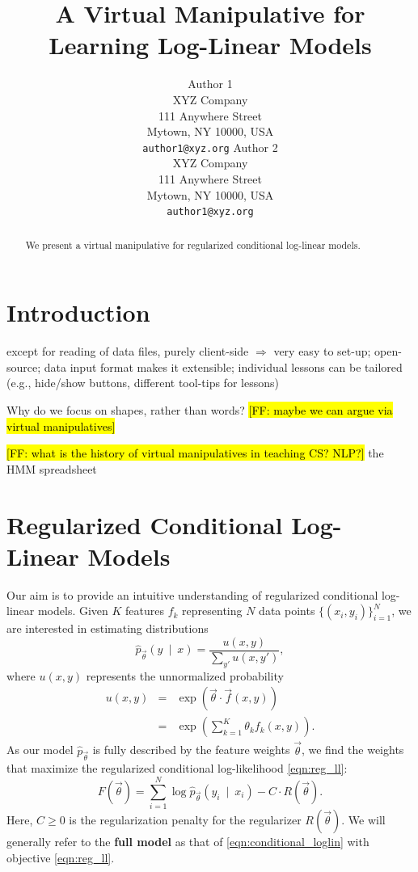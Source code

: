 \documentclass[11pt,letterpaper]{article}
\title{A Virtual Manipulative for Learning Log-Linear Models}
\author{
	 Author 1\\
	    XYZ Company\\
	    111 Anywhere Street\\
	    Mytown, NY 10000, USA\\
	    {\tt author1@xyz.org}
	  \And
	  Author 2\\
	    XYZ Company\\
	    111 Anywhere Street\\
	    Mytown, NY 10000, USA\\
	    {\tt author1@xyz.org}
 }
\date{}
\newcommand{\Note}[1]{}
\renewcommand{\Note}[1]{\hl{[#1]}}
\newcommand{\NoteSigned}[3]{{\sethlcolor{#2}\Note{#1: #3}}}
\newcommand{\NoteFF}[1]{\NoteSigned{FF}{LightBlue}{#1}}
\begin{document}
\maketitle

\begin{abstract}
We present a virtual manipulative for regularized conditional log-linear models. 
\end{abstract}

\section{Introduction}\label{sec:intro}
except for reading of data files, purely client-side $\Rightarrow$ very easy to set-up;
open-source;
data input format makes it extensible;
individual lessons can be tailored (e.g., hide/show buttons, different tool-tips for lessons)

Why do we focus on shapes, rather than words? \NoteFF{maybe we can argue via virtual manipulatives}

\NoteFF{what is the history of virtual manipulatives in teaching CS? NLP?} the HMM spreadsheet \cite{eisner-2002-tnlp}

\section{Regularized Conditional Log-Linear Models}
Our aim is to provide an intuitive understanding of regularized conditional log-linear models. Given $K$ features $f_k$ representing $N$ data points $\{( x_i, y_i)\}_{i=1}^N$, we are interested in estimating distributions 
\begin{equation}
\hat{p}_{\vec{\theta}}\left(y\ \mid\ x\right) = \frac{u(x, y)}{\sum_{y'} u(x,y')},
\label{eqn:conditional_loglin}
\end{equation}
where $u(x,y)$ represents the unnormalized probability
\begin{eqnarray}
u(x,y) & = & \exp{\left(\vec{\theta}\cdot \vec{f}(x,y)\right)}\\
& = & \exp{\left(\sum_{k=1}^K \theta_k f_k(x,y)\right)}.
\end{eqnarray}
As our model $\hat{p}_{\vec{\theta}}$ is fully described by the feature weights $\vec{\theta}$, we find the weights that maximize the regularized conditional log-likelihood \eqref{eqn:reg_ll}:
\begin{equation}
F\left(\vec{\theta}\right) = \sum_{i=1}^N \log{\hat{p}_{\vec{\theta}}\left(y_i\ \mid\ x_i\right)} - C \cdot R\left(\vec{\theta}\right).
\label{eqn:reg_ll}
\end{equation}
Here, $C \ge 0$ is the regularization penalty for the regularizer $R(\vec{\theta})$. We will generally refer to the \textbf{full model} as that of \eqref{eqn:conditional_loglin} with objective \eqref{eqn:reg_ll}.
\end{document}
